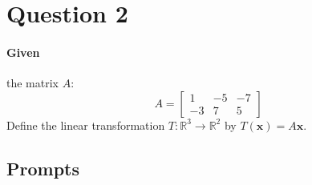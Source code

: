 \documentclass{article}
\begin{document}
    \section{Question 2}
        \paragraph{Given}
            the matrix $A$:
            $$
                A = \begin{bmatrix} 1 & -5 & -7 \\ -3 & 7 & 5 \end{bmatrix}
            $$
            Define the linear transformation $T: \mathbb{R}^3 \rightarrow \mathbb{R}^2$ by $T(\mathbf{x}) = A\mathbf{x}$.
        \subsection{Prompts}
\end{document}
